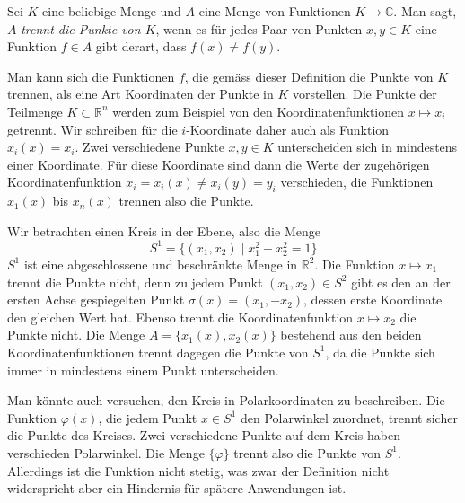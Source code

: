 \begin{definition}
Sei $K$ eine beliebige Menge und $A$ eine Menge von Funktionen
$K\to \mathbb{C}$.
Man sagt, $A$ {\em trennt die Punkte von $K$}, wenn es für jedes Paar
%
von Punkten $x,y\in K$ eine Funktion $f\in A$ gibt derart, dass
$f(x)\ne f(y)$.
\end{definition}

Man kann sich die Funktionen $f$, die gemäss dieser Definition die Punkte
von $K$ trennen, als eine Art Koordinaten der Punkte in $K$ vorstellen.
Die Punkte der Teilmenge $K\subset \mathbb{R}^n$ werden zum Beispiel
von den Koordinatenfunktionen $x\mapsto x_i$ getrennt.
Wir schreiben für die $i$-Koordinate daher auch als Funktion $x_i(x)=x_i$.
Zwei verschiedene Punkte $x,y\in K$ unterscheiden sich in mindestens
einer Koordinate.
Für diese Koordinate sind dann die Werte der zugehörigen
Koordinatenfunktion $x_i=x_i(x)\ne x_i(y)=y_i$ verschieden, die
Funktionen $x_1(x)$ bis $x_n(x)$ trennen also die Punkte.

\begin{beispiel}
Wir betrachten einen Kreis in der Ebene, also die Menge
\[
S^1
=
\{(x_1,x_2)\;|\; x_1^2 + x_2^2=1\}
\]
$S^1$ ist eine abgeschlossene und beschränkte Menge in $\mathbb{R}^2$.
Die Funktion $x\mapsto x_1$ trennt die Punkte nicht, denn zu jedem
Punkt $(x_1,x_2)\in S^2$ gibt es den an der ersten Achse
gespiegelten Punkt $\sigma(x)=(x_1,-x_2)$, dessen erste Koordinate
den gleichen Wert hat.
Ebenso trennt die Koordinatenfunktion $x\mapsto x_2$ die Punkte nicht.
Die Menge $A=\{ x_1(x), x_2(x)\}$ bestehend aus den beiden
Koordinatenfunktionen trennt dagegen die Punkte von $S^1$, da die Punkte
sich immer in mindestens einem Punkt unterscheiden.

Man könnte auch versuchen, den Kreis in Polarkoordinaten zu beschreiben.
Die Funktion $\varphi(x)$, die jedem Punkt $x\in S^1$ den Polarwinkel
zuordnet, trennt sicher die Punkte des Kreises.
Zwei verschiedene Punkte auf dem Kreis haben verschieden Polarwinkel.
Die Menge $\{\varphi\}$ trennt also die Punkte von $S^1$.
Allerdings ist die Funktion nicht stetig, was zwar der Definition
nicht widerspricht aber ein Hindernis für spätere Anwendungen ist.
\end{beispiel}


